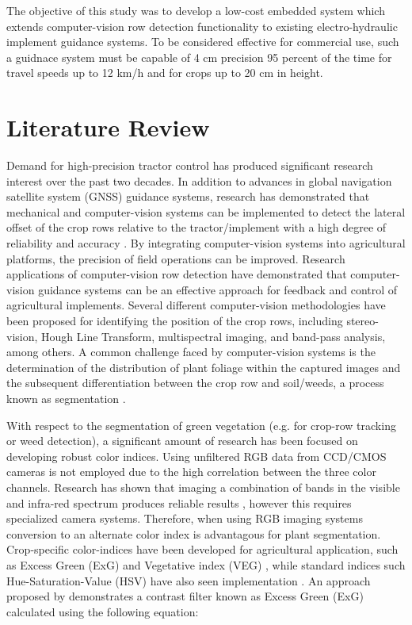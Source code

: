 \documentclass[authoryear]{elsarticle}
\begin{document}
The objective of this study was to develop a low-cost embedded system
which extends computer-vision row detection functionality to existing
electro-hydraulic implement guidance systems. To be considered
effective for commercial use, such a guidnace system must be capable
of 4 cm precision 95 percent of the  time for travel speeds up to 12
km/h and for crops up to 20 cm in height.

\section{Literature Review}
Demand for high-precision tractor control has produced significant
research interest over the past two decades. In addition to advances
in global navigation satellite system (GNSS) guidance systems,
research has demonstrated that mechanical and computer-vision systems
can be implemented to detect the lateral offset of the crop rows
relative to the tractor/implement with a high degree of reliability
and accuracy \citep{tillett1991}. By integrating computer-vision
systems into agricultural platforms, the precision of field operations
can be improved. Research applications of computer-vision row
detection have demonstrated that computer-vision guidance systems can
be an effective approach for feedback and control of agricultural
implements. Several different computer-vision methodologies have been
proposed for identifying the position of the crop rows, including
stereo-vision, Hough Line Transform, multispectral imaging, and
band-pass analysis, among others. A common challenge faced by
computer-vision systems is the determination of the distribution of plant
foliage within the captured images and the subsequent differentiation
between the crop row and soil/weeds, a process known as segmentation
\citep{brivot1996}.

With respect to the segmentation of green vegetation (e.g. for
crop-row tracking or weed detection), a significant amount of research
has been focused on developing robust color indices. Using unfiltered
RGB data from CCD/CMOS cameras is not employed due to the high
correlation between the three color channels. Research has shown that
imaging a combination of bands in the visible and infra-red spectrum
produces reliable results \citep{slaughter2008}, however this requires
specialized camera systems. Therefore, when using RGB imaging systems
conversion to an alternate color index is advantagous for plant
segmentation. Crop-specific color-indices have been developed for
agricultural application, such as Excess Green (ExG)
\citet{woebbecke1995} and Vegetative index (VEG) \citep{hague2006},
while standard indices such Hue-Saturation-Value (HSV) have also seen
implementation \citep{moorthy2015}. An approach proposed by
\citet{meyer1998} demonstrates a contrast filter known as Excess Green
(ExG) calculated using the following equation:
\end{document}
